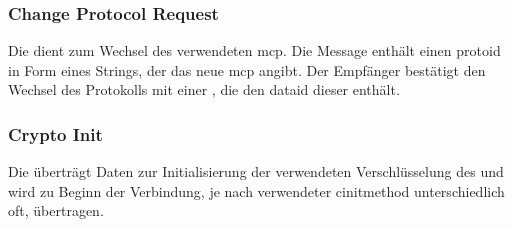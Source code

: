 \bmcpackbytefield


\subsubsection*{Change Protocol Request}
\label{dcl-bmcp-chprotoreq}
Die \msg{\bmcpchprotoreq} dient zum Wechsel des verwendeten \gls{mcp}.
Die Message enthält einen \gls{protoid} in Form eines Strings, der das neue
\gls{mcp} angibt.
Der Empfänger bestätigt den Wechsel des Protokolls mit einer \msg{\bmcpack},
die den \gls{dataid} dieser \msg{\bmcpchprotoreq} enthält.

\bmcpchprotoreqbytefield


\subsubsection*{Crypto Init}
\label{dcl-bmcp-cryptoinit}
Die \msg{\bmcpcryptoinit} überträgt Daten zur Initialisierung der verwendeten
Verschlüsselung des  und wird zu Beginn der Verbindung, je
nach verwendeter \gls{cinitmethod} unterschiedlich oft, übertragen.

\bmcpcryptoinitbytefield
